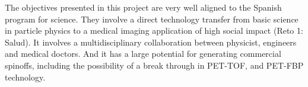 The objectives presented in this project are very well aligned to the Spanish program for science. They involve a direct technology transfer from basic science in particle physics to a medical imaging application of high social impact (Reto 1: Salud). It involves a multidisciplinary collaboration between physicist, engineers and medical doctors. And it has a large potential for generating commercial spinoffs, including the possibility of a break through in  PET-TOF, and PET-FBP technology.  
